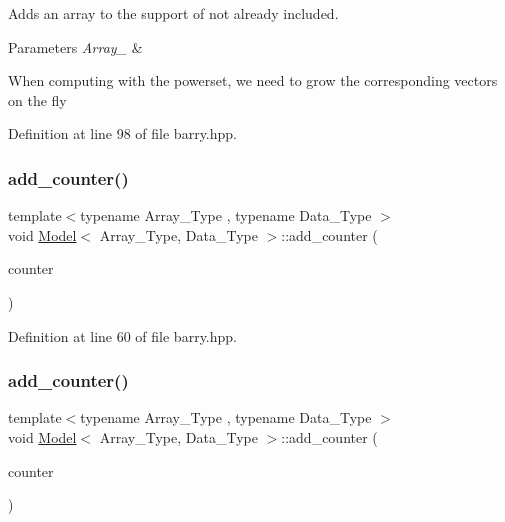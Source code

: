 Adds an array to the support of not already included. 


\begin{DoxyParams}{Parameters}
{\em Array\+\_\+} & \\
\hline
\end{DoxyParams}
When computing with the powerset, we need to grow the corresponding vectors on the fly 

Definition at line 98 of file barry.\+hpp.

\mbox{\label{classbarry_1_1_model_a1ed91acc6c747eabc8a83726c0ec7de5}} 
\subsubsection{\texorpdfstring{add\+\_\+counter()}{add\_counter()}\hspace{0.1cm}{\footnotesize\ttfamily [1/3]}}
{\footnotesize\ttfamily template$<$typename Array\+\_\+\+Type , typename Data\+\_\+\+Type $>$ \\
void \hyperlink{classbarry_1_1_model}{Model}$<$ Array\+\_\+\+Type, Data\+\_\+\+Type $>$\+::add\+\_\+counter (\begin{DoxyParamCaption}\item[{\hyperlink{classbarry_1_1_counter}{Counter}$<$ Array\+\_\+\+Type, Data\+\_\+\+Type $>$ \&}]{counter }\end{DoxyParamCaption})\hspace{0.3cm}{\ttfamily [inline]}}



Definition at line 60 of file barry.\+hpp.

\mbox{\label{classbarry_1_1_model_a05265a5a9a12109a4a2b56b3bb42015e}} 
\subsubsection{\texorpdfstring{add\+\_\+counter()}{add\_counter()}\hspace{0.1cm}{\footnotesize\ttfamily [2/3]}}
{\footnotesize\ttfamily template$<$typename Array\+\_\+\+Type , typename Data\+\_\+\+Type $>$ \\
void \hyperlink{classbarry_1_1_model}{Model}$<$ Array\+\_\+\+Type, Data\+\_\+\+Type $>$\+::add\+\_\+counter (\begin{DoxyParamCaption}\item[{\hyperlink{classbarry_1_1_counter}{Counter}$<$ Array\+\_\+\+Type, Data\+\_\+\+Type $>$ $\ast$}]{counter }\end{DoxyParamCaption})\hspace{0.3cm}{\ttfamily [inline]}}



